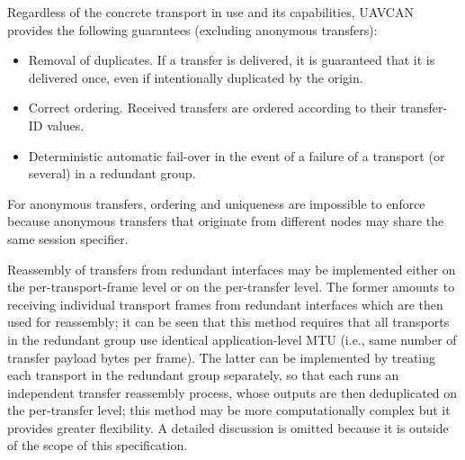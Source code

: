 \begin{remark}
    Regardless of the concrete transport in use and its capabilities,
    UAVCAN provides the following guarantees (excluding anonymous transfers):

    \begin{itemize}
        \item Removal of duplicates. If a transfer is delivered, it is guaranteed that it is delivered once,
              even if intentionally duplicated by the origin.
        \item Correct ordering. Received transfers are ordered according to their transfer-ID values.
        \item Deterministic automatic fail-over in the event of a failure of a transport (or several)
              in a redundant group.
    \end{itemize}

    For anonymous transfers, ordering and uniqueness are impossible to enforce
    because anonymous transfers that originate from different nodes may share the same session specifier.

    Reassembly of transfers from redundant interfaces may be implemented either on the per-transport-frame level
    or on the per-transfer level.
    The former amounts to receiving individual transport frames from redundant interfaces
    which are then used for reassembly; it can be seen that this method requires that all transports in the
    redundant group use identical application-level MTU (i.e., same number of transfer payload bytes per frame).
    The latter can be implemented by treating each transport in the redundant group separately,
    so that each runs an independent transfer reassembly process, whose outputs are then deduplicated
    on the per-transfer level; this method may be more computationally complex but it provides greater flexibility.
    A detailed discussion is omitted because it is outside of the scope of this specification.
\end{remark}
